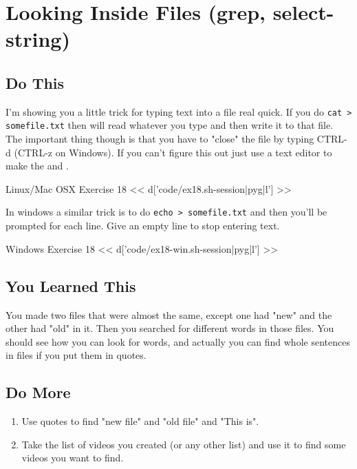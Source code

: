 \chapter{Looking Inside Files (grep, select-string)}

\section{Do This}

I'm showing you a little trick for typing text into a file real quick.  If you
do \verb|cat > somefile.txt| then  will read whatever you type and
then write it to that file.  The important thing though is that you have to
"close" the file by typing CTRL-d (CTRL-z on Windows).  If you can't figure this 
out just use a text editor to make the  and .

\begin{code}{Linux/Mac OSX Exercise 18}
<< d['code/ex18.sh-session|pyg|l'] >>
\end{code}

In windows a similar trick is to do \verb|echo > somefile.txt| and then you'll
be prompted for each line.  Give an empty line to stop entering text.

\begin{code}{Windows Exercise 18}
<< d['code/ex18-win.sh-session|pyg|l'] >>
\end{code}

\section{You Learned This}

You made two files that were almost the same, except one had "new" and the other 
had "old" in it.  Then you searched for different words in those files.  You should
see how you can look for words, and actually you can find whole sentences in
files if you put them in quotes.

\section{Do More}

\begin{enumerate}
\item Use quotes to find "new file" and "old file" and "This is".
\item Take the list of videos you created (or any other list) and use it to find some videos you want to find.
\end{enumerate}

